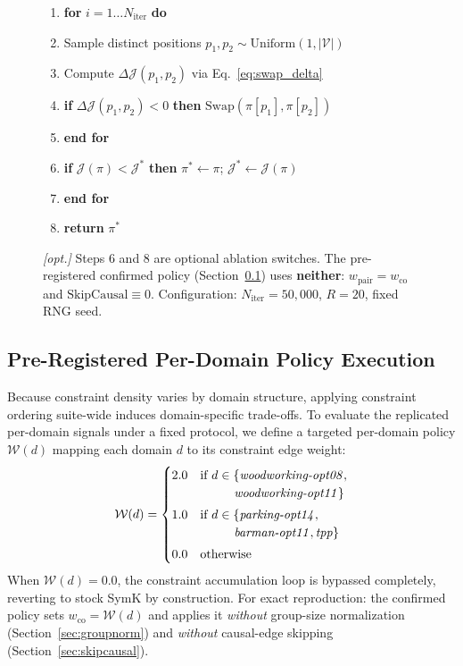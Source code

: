 \documentclass[twocolumn,10pt]{article}
\newcounter{myalgo}
\begin{document}
\begin{figure}[htbp]
\begin{pseudobox}
\begin{enumerate}
    \item \quad \textbf{for} $i = 1 \dots N_{\text{iter}}$ \textbf{do}
    \item \quad \quad Sample distinct positions $p_1, p_2 \sim \text{Uniform}(1, |\mathcal{V}|)$
    \item \quad \quad Compute $\Delta \mathcal{J}(p_1, p_2)$ via Eq.~\ref{eq:swap_delta}
    \item \quad \quad \textbf{if} $\Delta \mathcal{J}(p_1, p_2) < 0$ \textbf{then} $\text{Swap}(\pi[p_1], \pi[p_2])$
    \item \quad \textbf{end for}
    \item \quad \textbf{if} $\mathcal{J}(\pi) < \mathcal{J}^*$ \textbf{then} $\pi^* \leftarrow \pi$; \quad $\mathcal{J}^* \leftarrow \mathcal{J}(\pi)$
    \item \textbf{end for}
    \item \textbf{return} $\pi^*$
\end{enumerate}
\vspace{0.3em}
\footnotesize \textit{[opt.]} Steps 6 and 8 are optional ablation switches. The pre-registered confirmed policy (Section~\ref{sec:policy}) uses \textbf{neither}: $w_{\text{pair}} = w_{\text{co}}$ and $\text{SkipCausal} \equiv 0$. Configuration: $N_{\text{iter}} = 50{,}000$, $R = 20$, fixed RNG seed.
\end{pseudobox}
\end{figure}

\subsection{Pre-Registered Per-Domain Policy Execution}
\label{sec:policy}
Because constraint density varies by domain structure, applying constraint ordering suite-wide induces domain-specific trade-offs. To evaluate the replicated per-domain signals under a fixed protocol, we define a targeted per-domain policy $\mathcal{W}(d)$ mapping each domain $d$ to its constraint edge weight:
\begin{equation}
    \mathcal{W}(d) = \begin{cases}
        2.0 & \text{if } d \in \{\text{\textit{woodworking-opt08}}, \\
            & \qquad\;\;\, \text{\textit{woodworking-opt11}}\} \\[0.3em]
        1.0 & \text{if } d \in \{\text{\textit{parking-opt14}}, \\
            & \qquad\;\;\, \text{\textit{barman-opt11}}, \text{\textit{tpp}}\} \\[0.3em]
        0.0 & \text{otherwise}
    \end{cases}
    \label{eq:policy_weights}
\end{equation}
When $\mathcal{W}(d) = 0.0$, the constraint accumulation loop is bypassed completely, reverting to stock \textsf{SymK} by construction. For exact reproduction: the confirmed policy sets $w_{\text{co}} = \mathcal{W}(d)$ and applies it \emph{without} group-size normalization (Section~\ref{sec:groupnorm}) and \emph{without} causal-edge skipping (Section~\ref{sec:skipcausal}).
\end{document}
